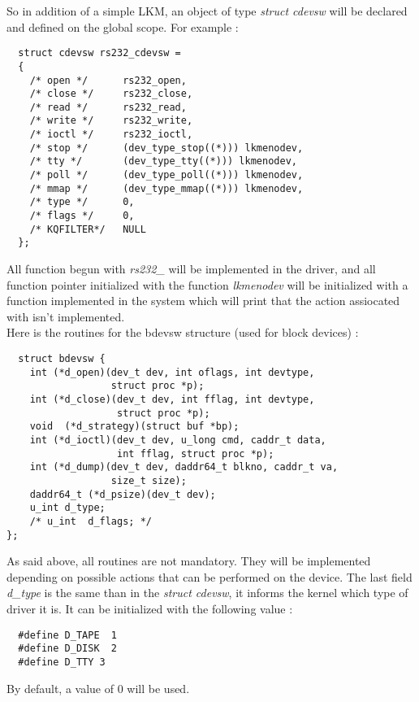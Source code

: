 \documentclass[11pt]{report}
\begin{document}
So in addition of a simple LKM, an object of type {\it struct cdevsw} will be declared
and defined on the global scope. For example :
\begin{lstlisting}
  struct cdevsw rs232_cdevsw =
  {
    /* open */      rs232_open,
    /* close */     rs232_close,
    /* read */      rs232_read,
    /* write */     rs232_write,
    /* ioctl */     rs232_ioctl,
    /* stop */      (dev_type_stop((*))) lkmenodev,
    /* tty */       (dev_type_tty((*))) lkmenodev,
    /* poll */      (dev_type_poll((*))) lkmenodev,
    /* mmap */      (dev_type_mmap((*))) lkmenodev,
    /* type */      0,
    /* flags */     0,
    /* KQFILTER*/   NULL
  };
\end{lstlisting}  
All function begun with {\it rs232\_} will be implemented in the driver, and all
function pointer initialized with the function {\it lkmenodev} will be initialized
with a function implemented in the system which will print that the action assiocated
with isn't implemented.\\

Here is the routines for the bdevsw structure (used for block devices) :
\begin{lstlisting}
  struct bdevsw {
    int (*d_open)(dev_t dev, int oflags, int devtype,
                  struct proc *p);
    int (*d_close)(dev_t dev, int fflag, int devtype,
                   struct proc *p);
    void  (*d_strategy)(struct buf *bp);
    int (*d_ioctl)(dev_t dev, u_long cmd, caddr_t data,
                   int fflag, struct proc *p);
    int (*d_dump)(dev_t dev, daddr64_t blkno, caddr_t va,
                  size_t size);
    daddr64_t (*d_psize)(dev_t dev);
    u_int d_type;
    /* u_int  d_flags; */
};
\end{lstlisting}
As said above, all routines are not mandatory. They will be implemented depending on
possible actions that can be performed on the device. The last field {\it d\_type}
is the same than in the {\it struct cdevsw}, it informs the kernel which type of
driver it is. It can be initialized with the following value :
\begin{lstlisting}
  #define D_TAPE  1
  #define D_DISK  2
  #define D_TTY 3
\end{lstlisting}
By default, a value of 0 will be used.
\end{document}

